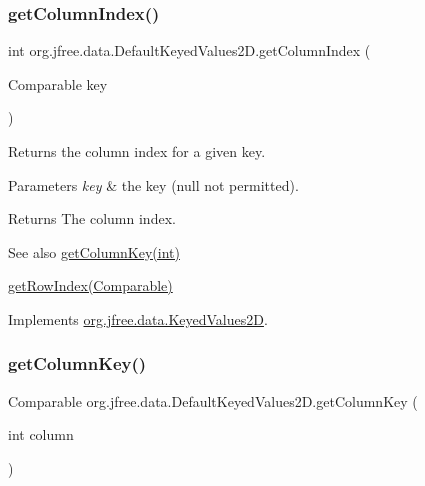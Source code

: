 \subsubsection{\texorpdfstring{get\+Column\+Index()}{getColumnIndex()}}
{\footnotesize\ttfamily int org.\+jfree.\+data.\+Default\+Keyed\+Values2\+D.\+get\+Column\+Index (\begin{DoxyParamCaption}\item[{Comparable}]{key }\end{DoxyParamCaption})}

Returns the column index for a given key.


\begin{DoxyParams}{Parameters}
{\em key} & the key ({\ttfamily null} not permitted).\\
\hline
\end{DoxyParams}
\begin{DoxyReturn}{Returns}
The column index.
\end{DoxyReturn}
\begin{DoxySeeAlso}{See also}
\mbox{\hyperlink{classorg_1_1jfree_1_1data_1_1_default_keyed_values2_d_af2df339aaadf2c30c6fb2e331a69c39c}{get\+Column\+Key(int)}} 

\mbox{\hyperlink{classorg_1_1jfree_1_1data_1_1_default_keyed_values2_d_aaca2e39352630d0f49c45a09b8a106e6}{get\+Row\+Index(\+Comparable)}} 
\end{DoxySeeAlso}


Implements \mbox{\hyperlink{interfaceorg_1_1jfree_1_1data_1_1_keyed_values2_d_a3360f2f612f16e8c90409d65e3992d38}{org.\+jfree.\+data.\+Keyed\+Values2D}}.

\mbox{\label{classorg_1_1jfree_1_1data_1_1_default_keyed_values2_d_af2df339aaadf2c30c6fb2e331a69c39c}} 
\subsubsection{\texorpdfstring{get\+Column\+Key()}{getColumnKey()}}
{\footnotesize\ttfamily Comparable org.\+jfree.\+data.\+Default\+Keyed\+Values2\+D.\+get\+Column\+Key (\begin{DoxyParamCaption}\item[{int}]{column }\end{DoxyParamCaption})}

